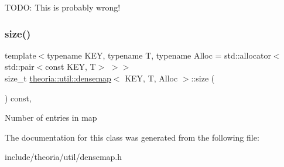 T\+O\+DO\+: This is probably wrong! \mbox{\label{classtheoria_1_1util_1_1densemap_a3d482d15fc6ea59df3b04d5672aa22de}} 
\subsubsection{\texorpdfstring{size()}{size()}}
{\footnotesize\ttfamily template$<$typename K\+EY, typename T, typename Alloc = std\+::allocator$<$std\+::pair$<$const K\+E\+Y, T$>$ $>$$>$ \\
size\+\_\+t \hyperlink{classtheoria_1_1util_1_1densemap}{theoria\+::util\+::densemap}$<$ K\+EY, T, Alloc $>$\+::size (\begin{DoxyParamCaption}{ }\end{DoxyParamCaption}) const\hspace{0.3cm}{\ttfamily [inline]}, {\ttfamily [noexcept]}}

Number of entries in map 

The documentation for this class was generated from the following file\+:\begin{DoxyCompactItemize}
\item 
include/theoria/util/densemap.\+h\end{DoxyCompactItemize}
